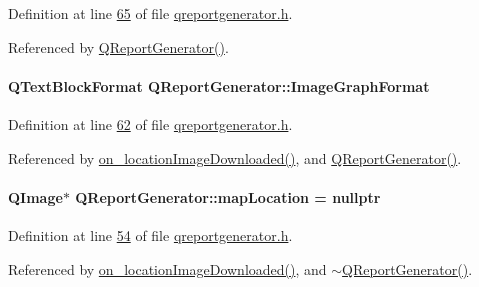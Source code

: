 Definition at line \hyperlink{qreportgenerator_8h_source_l00065}{65} of file \hyperlink{qreportgenerator_8h_source}{qreportgenerator.\+h}.



Referenced by \hyperlink{qreportgenerator_8cpp_source_l00004}{Q\+Report\+Generator()}.

\hypertarget{class_q_report_generator_a19451127788bb6c68907b312a0a8b750}{}
\paragraph[{Image\+Graph\+Format}]{\setlength{\rightskip}{0pt plus 5cm}Q\+Text\+Block\+Format Q\+Report\+Generator\+::\+Image\+Graph\+Format\hspace{0.3cm}{\ttfamily [private]}}\label{class_q_report_generator_a19451127788bb6c68907b312a0a8b750}


Definition at line \hyperlink{qreportgenerator_8h_source_l00062}{62} of file \hyperlink{qreportgenerator_8h_source}{qreportgenerator.\+h}.



Referenced by \hyperlink{qreportgenerator_8cpp_source_l00376}{on\+\_\+location\+Image\+Downloaded()}, and \hyperlink{qreportgenerator_8cpp_source_l00004}{Q\+Report\+Generator()}.

\hypertarget{class_q_report_generator_a1369081e13fce26f60a10eb846551515}{}
\paragraph[{map\+Location}]{\setlength{\rightskip}{0pt plus 5cm}Q\+Image$\ast$ Q\+Report\+Generator\+::map\+Location = nullptr\hspace{0.3cm}{\ttfamily [private]}}\label{class_q_report_generator_a1369081e13fce26f60a10eb846551515}


Definition at line \hyperlink{qreportgenerator_8h_source_l00054}{54} of file \hyperlink{qreportgenerator_8h_source}{qreportgenerator.\+h}.



Referenced by \hyperlink{qreportgenerator_8cpp_source_l00376}{on\+\_\+location\+Image\+Downloaded()}, and \hyperlink{qreportgenerator_8cpp_source_l00394}{$\sim$\+Q\+Report\+Generator()}.

